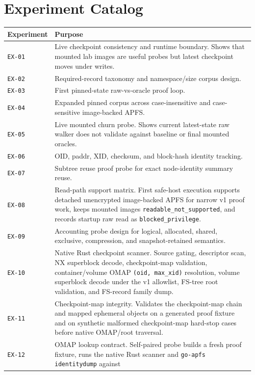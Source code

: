 \chapter{Experiment Catalog}

\begin{longtable}{p{}p{}}
\textbf{Experiment} & \textbf{Purpose} \\
\hline
\texttt{EX-01} & Live checkpoint consistency and runtime boundary. Shows that
mounted lab images are useful probes but latest checkpoint moves under writes. \\
\texttt{EX-02} & Required-record taxonomy and namespace/size corpus design. \\
\texttt{EX-03} & First pinned-state raw-vs-oracle proof loop. \\
\texttt{EX-04} & Expanded pinned corpus across case-insensitive and
case-sensitive image-backed APFS. \\
\texttt{EX-05} & Live mounted churn probe. Shows current latest-state raw walker
does not validate against baseline or final mounted oracles. \\
\texttt{EX-06} & OID, paddr, XID, checksum, and block-hash identity tracking. \\
\texttt{EX-07} & Subtree reuse proof probe for exact node-identity summary reuse. \\
\texttt{EX-08} & Read-path support matrix. First safe-host execution supports
detached unencrypted image-backed APFS for narrow v1 proof work, keeps mounted
images \texttt{readable\_not\_supported}, and records startup raw read as
\texttt{blocked\_privilege}. \\
\texttt{EX-09} & Accounting probe design for logical, allocated, shared,
exclusive, compression, and snapshot-retained semantics. \\
\texttt{EX-10} & Native Rust checkpoint scanner. Source gating, descriptor
scan, NX superblock decode, checkpoint-map validation, container/volume OMAP
\texttt{(oid, max\_xid)} resolution, volume superblock decode under the v1
allowlist, FS-tree root validation, and FS-record family dump. \\
\texttt{EX-11} & Checkpoint-map integrity. Validates the checkpoint-map chain
and mapped ephemeral objects on a generated proof fixture and on synthetic
malformed checkpoint-map hard-stop cases before native OMAP/root traversal. \\
\texttt{EX-12} & OMAP lookup contract. Self-paired probe builds a fresh proof
fixture, runs the native Rust scanner and \texttt{go-apfs identitydump} against

\end{longtable}
